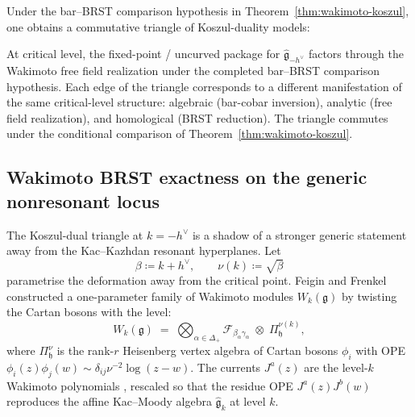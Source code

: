 \begin{remark}\label{rem:wakimoto-triangle}
Under the bar--BRST comparison hypothesis in
Theorem~\ref{thm:wakimoto-koszul}, one obtains a commutative triangle
of Koszul-duality models:
\begin{center}
\end{center}
At critical level, the fixed-point / uncurved package for
$\widehat{\mathfrak{g}}_{-h^\vee}$ factors through the Wakimoto free
field realization under the completed bar--BRST comparison hypothesis.
Each edge of the triangle corresponds to a different manifestation of
the same critical-level structure: algebraic (bar-cobar inversion),
analytic (free field realization), and homological (BRST reduction).
The triangle commutes under the conditional comparison of
Theorem~\ref{thm:wakimoto-koszul}.
\end{remark}

\subsection{Wakimoto BRST exactness on the generic nonresonant locus}
\label{subsec:wakimoto-brst-nondegenerate}

The Koszul-dual triangle at $k = -h^\vee$ is a shadow of a stronger
generic statement away from the Kac--Kazhdan resonant hyperplanes. Let
\[
\beta\coloneqq k + h^\vee, \qquad \nu(k)\coloneqq\sqrt{\beta}
\]
parametrise the deformation away from the critical point. Feigin and
Frenkel constructed a one-parameter family of Wakimoto modules
$W_k(\mathfrak{g})$ by twisting the Cartan bosons with the level:
\[
W_k(\mathfrak{g})
\;=\;
\bigotimes_{\alpha\in\Delta_+}\mathcal{F}_{\beta_\alpha\gamma_\alpha}
\;\otimes\;
\Pi^{\nu(k)}_{\mathfrak{h}},
\]
where $\Pi^{\nu}_{\mathfrak{h}}$ is the rank-$r$ Heisenberg vertex
algebra of Cartan bosons $\phi_i$ with OPE
$\phi_i(z)\phi_j(w)\sim \delta_{ij}\nu^{-2}\log(z-w)$.
The currents $J^a(z)$ are the level-$k$ Wakimoto polynomials
\cite{Wakimoto86, FeiginFrenkel90bosonization}, rescaled so that
the residue OPE $J^a(z)J^b(w)$ reproduces the affine Kac--Moody
algebra $\widehat{\mathfrak{g}}_k$ at level $k$.

